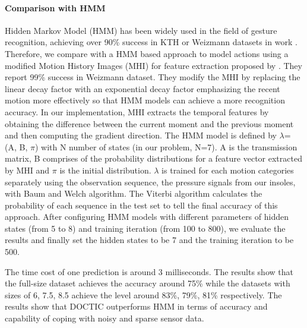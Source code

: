\documentclass[review]{vgtc}                 %
\begin{document}
\paragraph{Comparison with HMM}Hidden Markov Model (HMM) has been widely used in the field of gesture recognition, achieving over 90\% success in KTH or Weizmann datasets in work \cite{sundaresan2003hidden}\cite{wilson1999parametric}\cite{chen2003hand}\cite{eickeler1998hidden}. Therefore, we compare with a HMM based approach to model actions using a modified Motion History Images (MHI) for feature extraction proposed by \cite{alp2017action}. They report 99\% success in Weizmann dataset. They modify the MHI by replacing the linear decay factor with an exponential decay factor emphasizing the recent motion more effectively so that HMM models can achieve a more recognition accuracy. In our implementation, MHI extracts the temporal features by obtaining the difference between the current moment and the previous moment and then computing the gradient direction. The HMM model is defined by $\lambda$= (A, B, $\pi$) with N number of states (in our problem, N=7). A is the transmission matrix, B comprises of the probability distributions for a feature vector extracted by MHI and $\pi$ is the initial distribution. $\lambda$ is trained for each motion categories separately using the observation sequence, the pressure signals from our insoles, with Baum and Welch algorithm. The Viterbi algorithm calculates the probability of each sequence in the test set to tell the final accuracy of this approach. After configuring HMM models with different parameters of hidden states (from 5 to 8) and training iteration (from 100 to 800), we evaluate the results and finally set the hidden states to be 7 and the training iteration to be 500. 

The time cost of one prediction is around 3 milliseconds. 
The results show that the full-size dataset achieves the accuracy around 75\% while the datasets with sizes of 6, 7.5, 8.5 achieve the level around 83\%, 79\%, 81\% respectively.
The results show that DOCTIC outperforms HMM in terms of accuracy and capability of coping with noisy and sparse sensor data.
\end{document}
